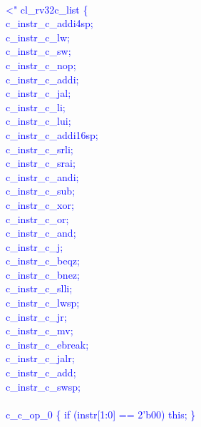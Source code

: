 \textcolor{blue}{
\\
\noindent \textless" cl\_rv32c\_list \{ \\%
\indent c\_instr\_c\_addi4sp;\\%
\indent c\_instr\_c\_lw;\\%
\indent c\_instr\_c\_sw;\\%
\indent c\_instr\_c\_nop;\\%
\indent c\_instr\_c\_addi; \\%
\indent c\_instr\_c\_jal;\\%
\indent c\_instr\_c\_li;\\%
\indent c\_instr\_c\_lui;\\%
\indent c\_instr\_c\_addi16sp;\\%
\indent c\_instr\_c\_srli;\\%
\indent c\_instr\_c\_srai;\\%
\indent c\_instr\_c\_andi;\\%
\indent c\_instr\_c\_sub;\\%
\indent c\_instr\_c\_xor;\\%
\indent c\_instr\_c\_or;\\%
\indent c\_instr\_c\_and;\\%
\indent c\_instr\_c\_j;\\%
\indent c\_instr\_c\_beqz;\\%
\indent c\_instr\_c\_bnez;\\%
\indent c\_instr\_c\_slli;\\%
\indent c\_instr\_c\_lwsp;\\%
\indent c\_instr\_c\_jr;\\%
\indent c\_instr\_c\_mv;\\%
\indent c\_instr\_c\_ebreak;\\%
\indent c\_instr\_c\_jalr;\\%
\indent c\_instr\_c\_add;\\%
\indent c\_instr\_c\_swsp;\\%
\\
\indent c\_c\_op\_0 \{ if (instr[1:0] == 2'b00) this; \}\\%
}
